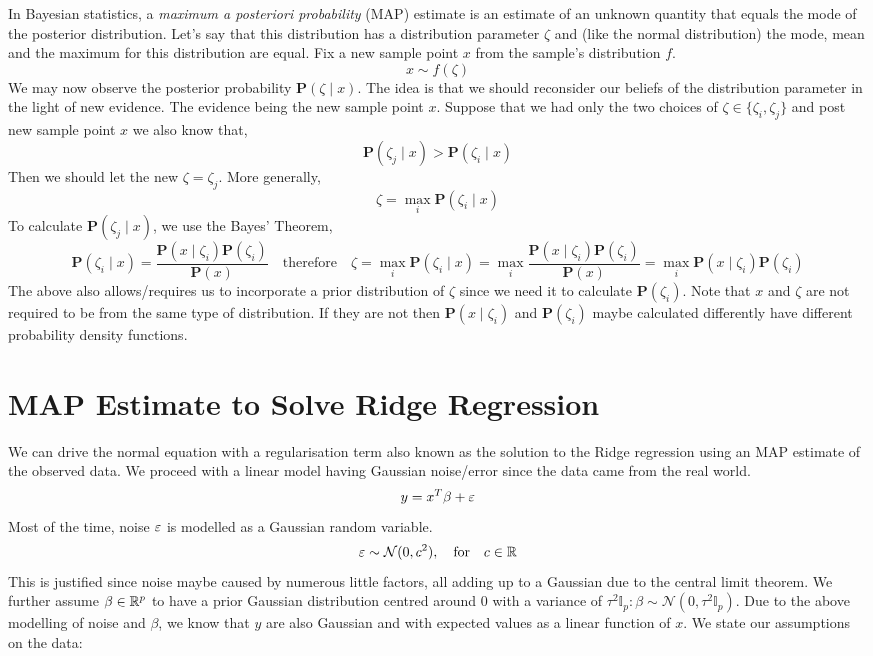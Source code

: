 \documentclass{homework}
\renewcommand\P{\mathbf{P}}
\begin{document}
In Bayesian statistics, a \textit{maximum a posteriori probability}
(MAP) estimate is an estimate of an unknown quantity that equals the
mode of the posterior distribution. Let's say that this distribution
has a distribution parameter $\zeta$ and (like the normal
distribution) the mode, mean and the maximum for this distribution are
equal. Fix a new sample point $x$ from the sample's distribution $f$.
\[
  x \sim f(\zeta)
\]
We may now observe the posterior probability $\P(\zeta \mid x)$. The
idea is that we should reconsider our beliefs of the distribution
parameter in the light of new evidence. The evidence being the new
sample point $x$. Suppose that we had only the two choices of
$\zeta \in \{\zeta_i, \zeta_j\}$ and post new sample point $x$ we also
know that,
\[
  \P(\zeta_j \mid x) >  \P(\zeta_i \mid x)
\]
Then we should let the new $\zeta = \zeta_j$. More generally,
\[
  \zeta = \max_i \P(\zeta_i \mid x)
\]
To calculate $\P(\zeta_j \mid x)$, we use the Bayes' Theorem,
\[
  \P(\zeta_i \mid x) = \frac{\P(x \mid \zeta_i)\P(\zeta_i)}{\P(x)}
  \quad \text{therefore} \quad
  \zeta = \max_i \P(\zeta_i \mid x)
  = \max_i \frac{\P(x \mid \zeta_i)\P(\zeta_i)}{\P(x)}
  = \max_i \P(x \mid \zeta_i)\P(\zeta_i)
\]
The above also allows/requires us to incorporate a prior distribution
of $\zeta$ since we need it to calculate $\P(\zeta_i)$. Note that $x$
and $\zeta$ are not required to be from the same type of distribution.
If they are not then $\P(x \mid \zeta_i)$ and $\P(\zeta_i)$ maybe
calculated differently \eg have different probability density
functions.

\section{MAP Estimate to Solve Ridge Regression}
We can drive the normal equation with a regularisation term also known
as the solution to the Ridge regression using an MAP estimate of the
observed data. We proceed with a linear model having Gaussian
noise/error since the data came from the real world.
\[
  y = x^T\beta+\varepsilon
\]
Most of the time, noise $\varepsilon$ is modelled as a Gaussian random variable.
\[
  \varepsilon\sim\mathcal{N}(0, c^2), \quad \text{for} \quad c \in \mathbb{R}
\]
This is justified since noise maybe caused by numerous little factors,
all adding up to a Gaussian due to the central limit theorem. We
further assume $\beta\in\mathbb{R}^p$ to have a prior Gaussian distribution
centred around 0 with a variance of
$\tau^2\mathbb{I}_p: \beta \sim \mathcal{N}(0,
\tau^2\mathbb{I}_p)$. Due to the above modelling of noise and $\beta$,
we know that $y$ are also Gaussian and with expected values as a
linear function of $x$. We state our assumptions on the data:
\end{document}
